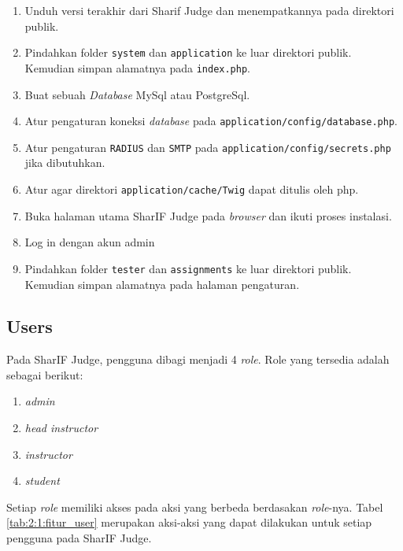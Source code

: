 \begin{enumerate}
	\item Unduh versi terakhir dari Sharif Judge dan menempatkannya pada direktori publik.
	\item Pindahkan folder \texttt{system} dan \texttt{application} ke luar direktori publik. Kemudian simpan alamatnya pada \texttt{index.php}.
	\item Buat sebuah \textit{Database} MySql atau PostgreSql.
	\item Atur pengaturan koneksi \textit{database} pada \texttt{application/config/database.php}.
	\item Atur pengaturan \texttt{RADIUS} dan \texttt{SMTP} pada \texttt{application/config/secrets.php} jika dibutuhkan.
	\item Atur agar direktori \texttt{application/cache/Twig} dapat ditulis oleh php.
	\item Buka halaman utama SharIF Judge pada \textit{browser} dan ikuti proses instalasi.
	\item Log in dengan akun admin
	\item Pindahkan folder \texttt{tester} dan \texttt{assignments} ke luar direktori publik. Kemudian simpan alamatnya pada halaman pengaturan.
\end{enumerate}

\newpage

\subsection{Users}
\label{sub:2:1:users}

Pada SharIF Judge, pengguna dibagi menjadi 4 \textit{role}. Role yang tersedia adalah sebagai berikut:

\begin{enumerate}
	\item \textit{admin}
	\item \textit{head instructor}
	\item \textit{instructor}
	\item \textit{student}
\end{enumerate}

Setiap \textit{role} memiliki akses pada aksi yang berbeda berdasakan \textit{role}-nya. Tabel \ref{tab:2:1:fitur_user} merupakan aksi-aksi yang dapat dilakukan untuk setiap pengguna pada SharIF Judge.

